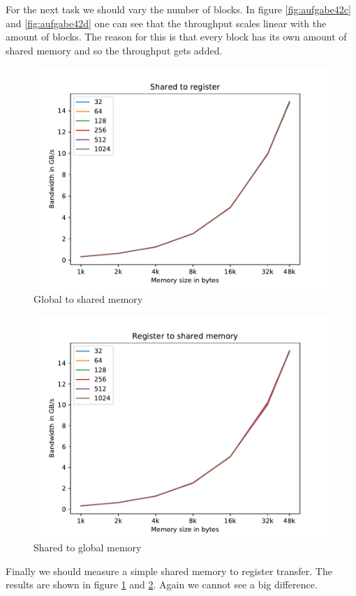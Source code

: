 \documentclass[12pt]{article}
\begin{document}
For the next task we should vary the number of blocks. In figure \ref{fig:aufgabe42c} and \ref{fig:aufgabe42d} one can see that the throughput scales linear with the amount of blocks. The reason for this is that every block has its own amount of shared memory and so the throughput gets added.

\begin{figure}[H]
	\centering
	\includegraphics[width=0.7\linewidth]{../../template/plots/aufgabe4_2e}
	\caption{Global to shared memory}
	\label{fig:aufgabe42e}
\end{figure}

\begin{figure}[H]
	\centering
	\includegraphics[width=0.7\linewidth]{../../template/plots/aufgabe4_2f}
	\caption{Shared to global memory}
	\label{fig:aufgabe42f}
\end{figure}

Finally we should measure a simple shared memory to register transfer. The results are shown in figure \ref{fig:aufgabe42e} and \ref{fig:aufgabe42f}. Again we cannot see a big difference. \\
\end{document}
